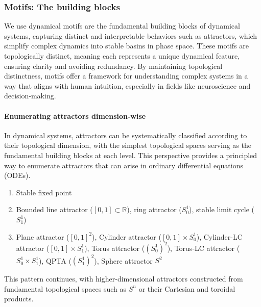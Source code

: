 \documentclass{article}
\theoremstyle{definition} \newtheorem{definition}{Definition}  \newtheorem{example}{Example}
\theoremstyle{remark} \newtheorem{remark}{Remark}
\newcommand{\reals}{\mathbb{R}}
\newcounter{ct}
\begin{document}
\subsubsection{Motifs: The building blocks}
We use dynamical motifs are the fundamental building blocks of dynamical systems, capturing distinct and interpretable behaviors such as attractors, which simplify complex dynamics into stable basins in phase space.
 These motifs are topologically distinct, meaning each represents a unique dynamical feature, ensuring clarity and avoiding redundancy.
  By maintaining topological distinctness, motifs offer a framework for understanding complex systems in a way that aligns with human intuition, especially in fields like neuroscience and decision-making.




\paragraph{Enumerating attractors dimension-wise}
In dynamical systems, attractors can be systematically classified according to their topological dimension, with the simplest topological spaces serving as the fundamental building blocks at each level.
 This perspective provides a principled way to enumerate attractors that can arise in ordinary differential equations (ODEs).
\begin{enumerate}[start=0,label={\bfseries Dim \arabic*:}]
\item  Stable fixed point
\item  Bounded line attractor ($[0,1]\subset\reals$), ring attractor ($S_0^1$), stable limit cycle ($S_1^1$)
\item Plane attractor ($[0,1]^2$), Cylinder attractor ($[0,1]\times S_0^1$), Cylinder-LC attractor ($[0,1]\times S_1^1$), Torus attractor ($(S_0^1)^2$), Torus-LC attractor ($S_0^1\times S_1^1$), QPTA ($(S_1^1)^2$), Sphere attractor $S^2$
\end{enumerate}
This pattern continues, with higher-dimensional attractors constructed from fundamental topological spaces such as $S^n$ or their Cartesian and toroidal products.
\end{document}
